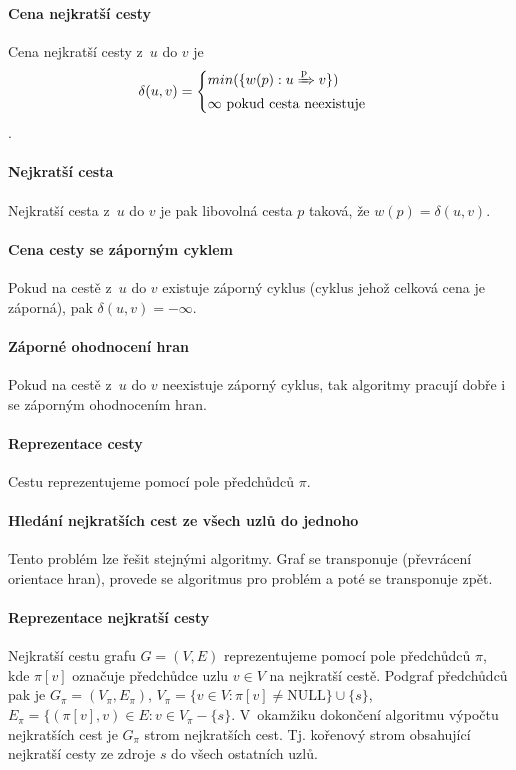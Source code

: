 \paragraph*{Cena nejkratší cesty} Cena nejkratší cesty z~$u$ do $v$ je $$
\delta(u, v) = \begin{cases}
    min( \{ w(p) : u \xRightarrow{\text{p}} v \} ) \\
    \infty ~ \text{pokud cesta neexistuje}
\end{cases}
$$.

\paragraph*{Nejkratší cesta} Nejkratší cesta z~$u$ do $v$ je pak libovolná cesta $p$ taková, že $w(p) = \delta(u, v)$.

\paragraph*{Cena cesty se záporným cyklem} Pokud na cestě z~$u$ do $v$ existuje záporný cyklus (cyklus jehož celková cena je záporná), pak $\delta(u, v) = - \infty$.

\paragraph*{Záporné ohodnocení hran} Pokud na cestě z~$u$ do $v$ neexistuje záporný cyklus, tak algoritmy pracují dobře i se záporným ohodnocením hran.

\paragraph*{Reprezentace cesty} Cestu reprezentujeme pomocí pole předchůdců $\pi$.

\paragraph*{Hledání nejkratších cest ze všech uzlů do jednoho} Tento problém lze řešit stejnými algoritmy. Graf se transponuje (převrácení orientace hran), provede se algoritmus pro problém  a poté se transponuje zpět.

\paragraph*{Reprezentace nejkratší cesty} Nejkratší cestu grafu $G = (V, E)$ reprezentujeme pomocí pole předchůdců $\pi$, kde $\pi[v]$ označuje předchůdce uzlu $v \in V$ na nejkratší cestě. Podgraf předchůdců pak je $G_{\pi} = (V_{\pi}, E_{\pi})$, $V_{\pi} = \{ v \in V : \pi[v] \neq \text{NULL} \} \cup \{ s \}$, $E_{\pi} = \{ (\pi[v], v) \in E : v \in V_{\pi} - \{ s \}$. V~okamžiku dokončení algoritmu výpočtu nejkratších cest je $G_{\pi}$ strom nejkratších cest. Tj. kořenový strom obsahující nejkratší cesty ze zdroje $s$ do všech ostatních uzlů.

